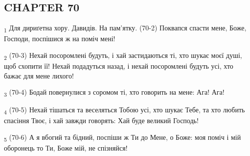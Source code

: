 \subsection{CHAPTER 70}
\begin{tcolorbox}
\textsubscript{1} Для дириґетна хору. Давидів. На пам'ятку. (70-2) Поквапся спасти мене, Боже, Господи, поспішися ж на поміч мені!
\end{tcolorbox}
\begin{tcolorbox}
\textsubscript{2} (70-3) Нехай посоромлені будуть, і хай застидаються ті, хто шукає моєї душі, щоб схопити її! Нехай подадуться назад, і нехай посоромлені будуть усі, хто бажає для мене лихого!
\end{tcolorbox}
\begin{tcolorbox}
\textsubscript{3} (70-4) Бодай повернулися з соромом ті, хто говорить на мене: Ага! Ага!
\end{tcolorbox}
\begin{tcolorbox}
\textsubscript{4} (70-5) Нехай тішаться та веселяться Тобою усі, хто шукає Тебе, та хто любить спасіння Твоє, і хай завжди говорять: Хай буде великий Господь!
\end{tcolorbox}
\begin{tcolorbox}
\textsubscript{5} (70-6) А я вбогий та бідний, поспіши ж Ти до Мене, о Боже: моя поміч і мій оборонець то Ти, Боже мій, не спізняйся!
\end{tcolorbox}
